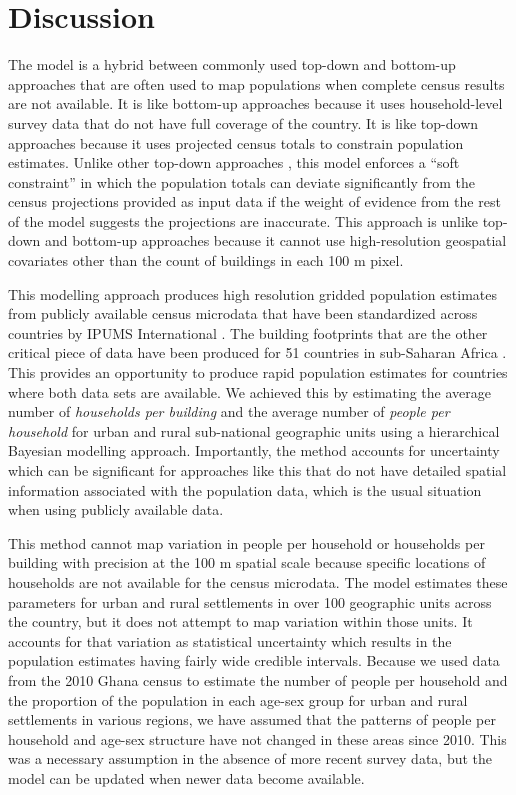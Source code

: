 \documentclass[]{book}
\begin{document}
\section{Discussion}\label{discussion}

The model is a hybrid between commonly used top-down and bottom-up
approaches \citep{wardrop2018spatially} that are often used to map
populations when complete census results are not available. It is like
bottom-up approaches because it uses household-level survey data that do
not have full coverage of the country. It is like top-down approaches
because it uses projected census totals to constrain population
estimates. Unlike other top-down approaches
\citep{stevens2015disaggregating}, this model enforces a ``soft
constraint'' in which the population totals can deviate significantly
from the census projections provided as input data if the weight of
evidence from the rest of the model suggests the projections are
inaccurate. This approach is unlike top-down and bottom-up approaches
because it cannot use high-resolution geospatial covariates other than
the count of buildings in each 100 m pixel.

This modelling approach produces high resolution gridded population
estimates from publicly available census microdata that have been
standardized across countries by IPUMS International
\citep{mpc2019integrated}. The building footprints that are the other
critical piece of data have been produced for 51 countries in
sub-Saharan Africa \citep{ecopia2020digitize, dooley2020gridded}. This
provides an opportunity to produce rapid population estimates for
countries where both data sets are available. We achieved this by
estimating the average number of \emph{households per building} and the
average number of \emph{people per household} for urban and rural
sub-national geographic units using a hierarchical Bayesian modelling
approach. Importantly, the method accounts for uncertainty which can be
significant for approaches like this that do not have detailed spatial
information associated with the population data, which is the usual
situation when using publicly available data.

This method cannot map variation in people per household or households
per building with precision at the 100 m spatial scale because specific
locations of households are not available for the census microdata. The
model estimates these parameters for urban and rural settlements in over
100 geographic units across the country, but it does not attempt to map
variation within those units. It accounts for that variation as
statistical uncertainty which results in the population estimates having
fairly wide credible intervals. Because we used data from the 2010 Ghana
census to estimate the number of people per household and the proportion
of the population in each age-sex group for urban and rural settlements
in various regions, we have assumed that the patterns of people per
household and age-sex structure have not changed in these areas since
2010. This was a necessary assumption in the absence of more recent
survey data, but the model can be updated when newer data become
available.
\end{document}
